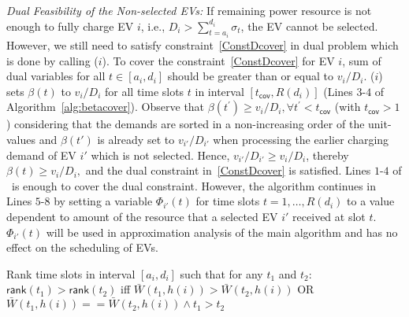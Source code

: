 		
\emph{Dual Feasibility of the Non-selected EVs:} If remaining power resource is not enough to fully charge EV $i$, i.e.,  $D_i>\sum_{t=a_i}^{d_i}\sigma_t$, the EV cannot be selected. However, we still need to satisfy constraint~\eqref{ConstDcover} in dual problem which is done by calling \bc($i$). To cover the constraint~\eqref{ConstDcover} for EV $i$, sum of dual variables for all $t\in [a_i ,d_i]$ should be greater than or equal to ${v_i \slash D_i}$. \bc($i$) sets $\beta (t)$ to ${v_i \slash D_i}$ for all time slots $t$ in interval $[t_\mathsf{cov}, R(d_i)]$ (Lines $3$-$4$ of Algorithm~\ref{alg:betacover}). Observe that  ${\beta (t^\prime)\geq v_i \slash D_i,\forall t^\prime< t_\mathsf{cov}}$ (with $ t_\mathsf{cov}>1$) considering that the demands are sorted in a non-increasing order of the unit-values and $\beta (t')$ is already set to ${v_{i'} \slash D_{i'}}$ when processing the earlier charging demand of EV $i'$ which is not selected. Hence, ${v_{i'}\slash  D_{i'}\geq v_i \slash D_i}$, thereby ${\beta (t)\geq v_i \slash D_i,}$ and the dual constraint in~\eqref{ConstDcover} is satisfied.		
		Lines $1$-$4$ of \bc\ is enough to cover the dual constraint. However, the algorithm continues in Lines $5$-$8$ by setting a variable $\Phi_{i'}(t)$ for time slots $t=1,\dots ,R(d_i)$ to a value dependent to amount of the resource that a selected EV $i'$ received at slot $t$. $\Phi_{i'}(t)$ will be used in approximation analysis of the main algorithm and has no effect on the scheduling of EVs. 
		\begin{algorithm}%
			\footnotesize
			\caption{\sa($i,D_i$)}
			\label{SmartAllocate}
			\DontPrintSemicolon 
			
			Rank time slots in interval $[a_i,d_i]$ such that for any $t_1$ and $t_2$:
			$\mathsf{rank}(t_1)> \mathsf{rank}(t_2)$ iff $\bar{W}(t_1,h(i))>\bar{W}(t_2,h(i))$ OR $\bar{W}(t_1,h(i))==\bar{W}(t_2,h(i)) \wedge t_1>t_2$ 
			
		\end{algorithm}	
